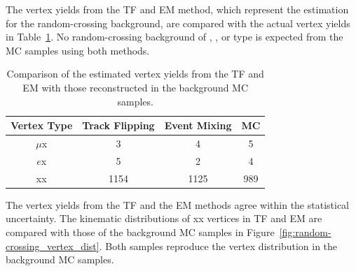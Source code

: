 The vertex yields from the TF and EM method, which represent the estimation for the random-crossing background, are compared with the actual vertex yields in Table~\ref{table:random_vertex_count}. No random-crossing background of \mumu, \ee, or \emu type is expected from the MC samples using both methods. 
 
\begin{table}[!htb]
  \centering
  \begin{tabular}{ c  c c c }
    \hline
    \hline
	Vertex Type					&Track Flipping	    &   Event Mixing 	    & MC                    \\
    \hline
	$\mu$x						&	3			    &	4        			&	5					\\
	$e$x						&	5			    &	2   				&	4					\\
	xx						    &	1154		    &	1125 				&	989 				\\
    \hline
    \hline
  \end{tabular}
  \caption{Comparison of the estimated vertex yields from the TF and EM with those reconstructed in the background MC samples.}
  \label{table:random_vertex_count}
\end{table}

The vertex yields from the TF and the EM methods agree within the statistical uncertainty. The kinematic distributions of xx vertices in TF and EM are compared with those of the background MC samples in Figure~\ref{fig:random-crossing_vertex_dist}. Both samples reproduce the vertex distribution in the background MC samples.

